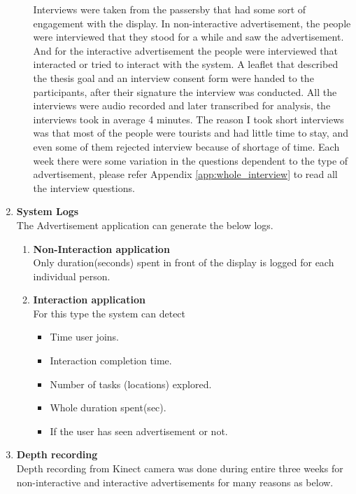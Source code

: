 \begin{enumerate}
\begin{enumerate}
Interviews were taken from the passersby that had some sort of engagement with the display. In non-interactive advertisement, the people were interviewed that they stood for a while and saw the advertisement. And for the interactive advertisement the people were interviewed that interacted or tried to interact with the system.
A leaflet that described the thesis goal and an interview consent form were handed to the participants, after their signature the interview was conducted. All the interviews were audio recorded and later transcribed for analysis, the interviews took in average 4 minutes. The reason I took short interviews was that most of the people were tourists and had little time to stay, and even some of them rejected interview because of shortage of time.
Each week there were some variation in the questions dependent to the type of advertisement, please refer Appendix \ref{app:whole_interview} to read all the interview questions.


\end{enumerate}


\item \textbf{System Logs} \\
The Advertisement application can generate the below logs.
\begin{enumerate}
\item	\textbf{Non-Interaction application} \\
Only duration(seconds) spent in front of the display is logged for each individual person.

\item	\textbf{Interaction application}\\
For this type the system can detect

\begin{itemize}
\item	Time user joins.
\item	Interaction completion time.
\item	Number of tasks (locations) explored.
\item	Whole duration spent(sec).
\item	If the user has seen advertisement or not.
\end{itemize}

\end{enumerate}

\item \textbf{Depth recording} \\
Depth recording from Kinect camera was done during entire three weeks for non-interactive and interactive advertisements for many reasons as below.


\end{enumerate}
